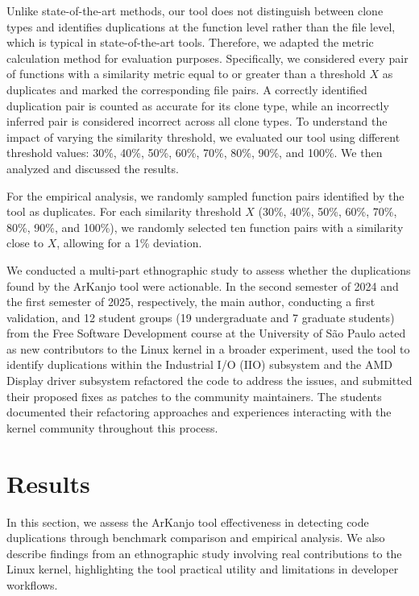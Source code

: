 \documentclass[conference]{IEEEtran}
\begin{document}
Unlike state-of-the-art methods, our tool does not distinguish between clone types and
identifies duplications at the function level rather than the file level, which is typical in
state-of-the-art tools. Therefore, we adapted the metric calculation method for evaluation
purposes. Specifically, we considered every pair of functions with a similarity metric
equal to or greater than a threshold $X$ as duplicates and marked the corresponding file
pairs. A correctly identified duplication pair is counted as accurate for its clone type, while
an incorrectly inferred pair is considered incorrect across all clone types.
To understand the impact of varying the similarity threshold, we evaluated our tool using
different threshold values: 30\%, 40\%, 50\%, 60\%, 70\%, 80\%, 90\%, and 100\%. We then analyzed
and discussed the results.

For the empirical analysis, we randomly sampled function pairs identified by the tool as
duplicates. For each similarity threshold $X$ (30\%, 40\%, 50\%, 60\%, 70\%, 80\%, 90\%, and 100\%), 
we randomly selected ten function pairs with a similarity close to $X$, allowing for a 1\%
deviation.

We conducted a multi-part ethnographic study to assess whether the duplications found by the ArKanjo tool were actionable. In the second semester of 2024 and the first semester of 2025, respectively, the main author, conducting a first validation, and 12 student groups (19 undergraduate and 7 graduate students) from the Free Software Development course at the University of São Paulo acted as new contributors to the Linux kernel in a broader experiment, used the tool to identify duplications within the Industrial I/O (IIO) subsystem and the AMD Display driver subsystem refactored the code to address the issues, and submitted their proposed fixes as patches to the community maintainers. The students documented their refactoring approaches and experiences interacting with the kernel community throughout this process.


\section{Results}

In this section, we assess the ArKanjo tool effectiveness in detecting code duplications through benchmark comparison and empirical analysis. We also describe findings from an ethnographic study involving real contributions to the Linux kernel, highlighting the tool practical utility and limitations in developer workflows.
\end{document}
